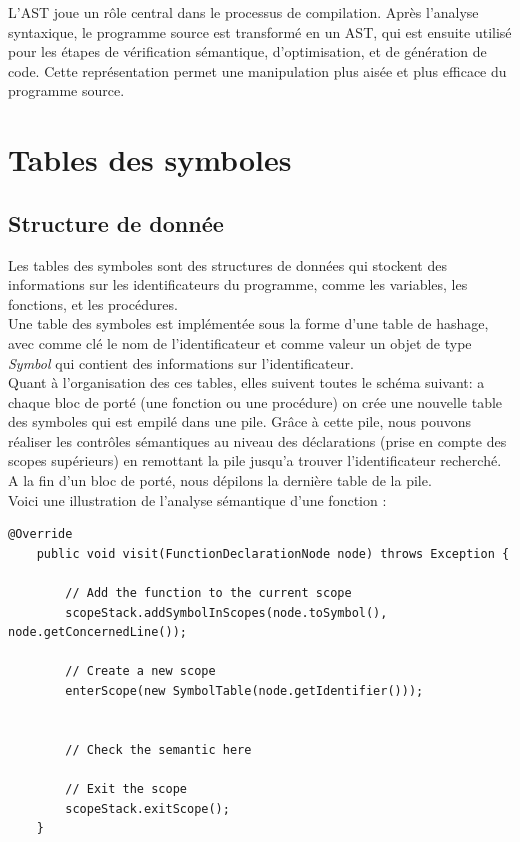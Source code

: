 \documentclass[french,a4paper]{article}
\begin{document}
    L'AST joue un rôle central dans le processus de compilation.
    Après l'analyse syntaxique, le programme source est transformé en un AST, qui est ensuite utilisé pour les étapes de vérification sémantique, d'optimisation, et de génération de code.
    Cette représentation permet une manipulation plus aisée et plus efficace du programme source.

    \section{Tables des symboles}

    \subsection{Structure de donnée}
    Les tables des symboles sont des structures de données qui stockent des informations sur les identificateurs du programme, comme les variables, les fonctions, et les procédures. \\

    Une table des symboles est implémentée sous la forme d'une table de hashage, avec comme clé le nom de l'identificateur et comme valeur un objet de type \textit{Symbol} qui contient des informations sur l'identificateur. \\

    Quant à l'organisation des ces tables, elles suivent toutes le schéma suivant:  a chaque bloc de porté (une fonction ou une procédure) on crée une nouvelle table des symboles qui est empilé dans une pile. Grâce à cette pile, nous pouvons réaliser les contrôles sémantiques au niveau des déclarations (prise en compte des scopes supérieurs) en remottant la pile jusqu'a trouver l'identificateur recherché. A la fin d'un bloc de porté, nous dépilons la dernière table de la pile.  \\

    Voici une illustration de l'analyse sémantique d'une fonction :
    \begin{lstlisting}[label={lst:lstlisting15}]
    @Override
    public void visit(FunctionDeclarationNode node) throws Exception {

        // Add the function to the current scope
        scopeStack.addSymbolInScopes(node.toSymbol(), node.getConcernedLine());

        // Create a new scope
        enterScope(new SymbolTable(node.getIdentifier()));


        // Check the semantic here

        // Exit the scope
        scopeStack.exitScope();
    }
    \end{lstlisting}
\end{document}

